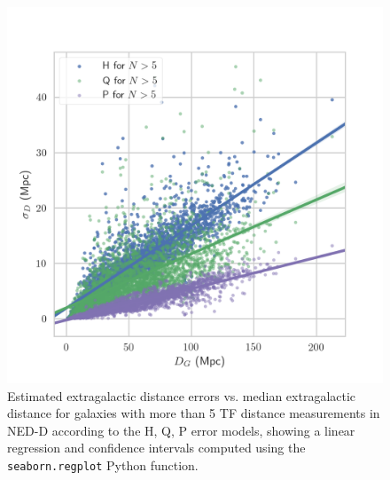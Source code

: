 \documentclass[a4paper,fleqn,usenatbib]{mnras}
\begin{document}
\begin{figure}

	\includegraphics[scale=0.7]{hqp.png}
    \caption{Estimated extragalactic distance errors vs. median extragalactic distance for galaxies with more than 5 TF distance measurements in NED-D according to the H, Q, P error models, showing a linear regression and confidence intervals computed using the \texttt{seaborn.regplot} Python function.}
    \label{fig:hqp}
\end{figure}
\end{document}
